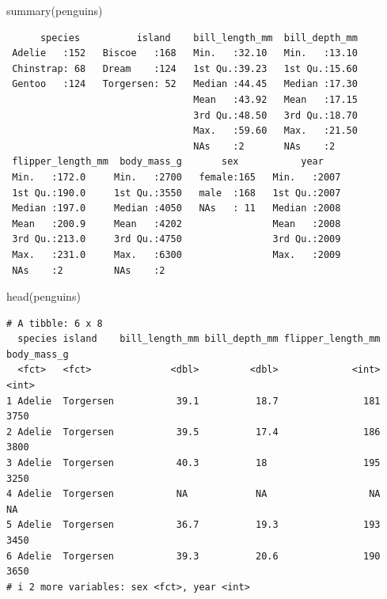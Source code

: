 \documentclass[
  letterpaper,
  DIV=11,
  numbers=noendperiod]{scrreprt}
\newenvironment{Shaded}{\begin{snugshade}}{\end{snugshade}}
\newcommand{\FunctionTok}[1]{\textcolor[rgb]{0.28,0.35,0.67}{#1}}
\newcommand{\NormalTok}[1]{\textcolor[rgb]{0.00,0.23,0.31}{#1}}
\begin{document}
\begin{Shaded}
\begin{Highlighting}[]
\FunctionTok{summary}\NormalTok{(penguins)}
\end{Highlighting}
\end{Shaded}

\begin{verbatim}
      species          island    bill_length_mm  bill_depth_mm  
 Adelie   :152   Biscoe   :168   Min.   :32.10   Min.   :13.10  
 Chinstrap: 68   Dream    :124   1st Qu.:39.23   1st Qu.:15.60  
 Gentoo   :124   Torgersen: 52   Median :44.45   Median :17.30  
                                 Mean   :43.92   Mean   :17.15  
                                 3rd Qu.:48.50   3rd Qu.:18.70  
                                 Max.   :59.60   Max.   :21.50  
                                 NAs    :2       NAs    :2      
 flipper_length_mm  body_mass_g       sex           year     
 Min.   :172.0     Min.   :2700   female:165   Min.   :2007  
 1st Qu.:190.0     1st Qu.:3550   male  :168   1st Qu.:2007  
 Median :197.0     Median :4050   NAs   : 11   Median :2008  
 Mean   :200.9     Mean   :4202                Mean   :2008  
 3rd Qu.:213.0     3rd Qu.:4750                3rd Qu.:2009  
 Max.   :231.0     Max.   :6300                Max.   :2009  
 NAs    :2         NAs    :2                                 
\end{verbatim}

\begin{Shaded}
\begin{Highlighting}[]
\FunctionTok{head}\NormalTok{(penguins)}
\end{Highlighting}
\end{Shaded}

\begin{verbatim}
# A tibble: 6 x 8
  species island    bill_length_mm bill_depth_mm flipper_length_mm body_mass_g
  <fct>   <fct>              <dbl>         <dbl>             <int>       <int>
1 Adelie  Torgersen           39.1          18.7               181        3750
2 Adelie  Torgersen           39.5          17.4               186        3800
3 Adelie  Torgersen           40.3          18                 195        3250
4 Adelie  Torgersen           NA            NA                  NA          NA
5 Adelie  Torgersen           36.7          19.3               193        3450
6 Adelie  Torgersen           39.3          20.6               190        3650
# i 2 more variables: sex <fct>, year <int>
\end{verbatim}
\end{document}
